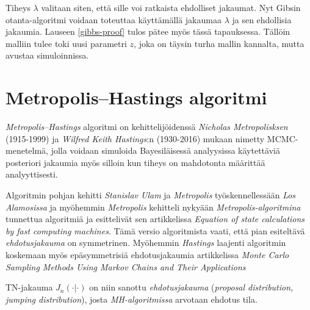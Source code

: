 Tiheys $\lambda$ valitaan siten, että sille voi ratkaista ehdolliset jakaumat. Nyt Gibsin otanta-algoritmi voidaan toteuttaa käyttämällä jakaumaa $\lambda$ ja sen ehdollisia jakaumia. Lauseen \ref{gibbs-proof} tulos pätee myös tässä tapauksessa. Tällöin malliin tulee toki uusi parametri $z$, joka on täysin turha mallin kannalta, mutta avustaa simuloinnissa.

\section{Metropolis--Hastings algoritmi}\label{Metropolis--Hastings algoritmi}

\textit{Metropolis--Hastings} algoritmi on kehittelijöidenssä \textit{Nicholas Metropolisksen} (1915-1999) ja \textit{Wilfred Keith Hastings}:n (1930-2016) mukaan nimetty MCMC-menetelmä, jolla voidaan simuloida Bayesiläisessä analyysissa käytettäviä posteriori jakaumia myös silloin kun tiheys on mahdotonta määrittää analyyttisesti.

Algoritmin pohjan kehitti \textit{Stanislav Ulam} ja \textit{Metropolis} työskennellessään \textit{Los Alamosissa} ja myöhemmin \textit{Metropolis} kehitteli nykyään \textit{Metropolis-algoritmina} tunnettua algoritmiä ja esittelivät sen artikkelissa \textit{Equation of state calculations by fast computing machines}\cite{metropolis_nicholas_equation_1953}. Tämä versio algoritmista vaati, että pian esiteltävä \textit{ehdotusjakauma} on symmetrinen. Myöhemmin \textit{Hastings} laajenti algoritmin koskemaan myös epäsymmetrisiä ehdotusjakaumia artikkelissa \textit{Monte Carlo Sampling Methods Using Markov Chains and Their Applications}

\begin{merk}
	TN-jakauma $J_n(\cdot|\cdot)$ on niin sanottu \textit{ehdotusjakauma} (\textit{proposal distribution, jumping distribution}), josta \textit{MH-algoritmissa} arvotaan ehdotus tila.
\end{merk}

